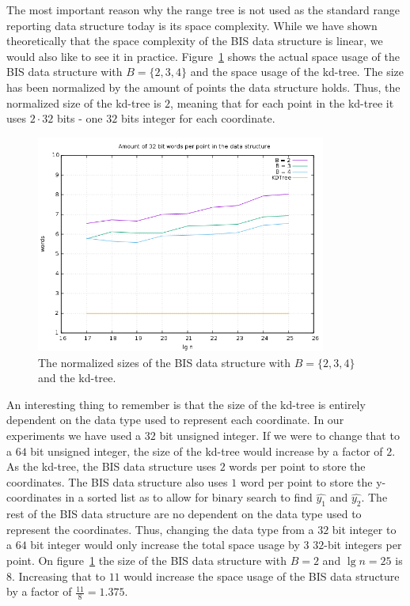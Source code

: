 The most important reason why the range tree is not used as the standard range reporting data structure today is its space complexity. While we have shown theoretically that the space complexity of the BIS data structure is linear, we would also like to see it in practice. Figure~\ref{fig:sizes} shows the actual space usage of the BIS data structure with $B=\{2,3,4\}$ and the space usage of the kd-tree. The size has been normalized by the amount of points the data structure holds. Thus, the normalized size of the kd-tree is $2$, meaning that for each point in the kd-tree it uses $2\cdot 32$ bits - one $32$ bits integer for each coordinate.

\begin{figure}[h]
    \centering
    \includegraphics[width = 0.85\textwidth]{pictures/analysis/sizes.png}
    \caption{The normalized sizes of the BIS data structure with $B=\{2,3,4\}$ and the kd-tree.}\label{fig:sizes}
\end{figure}
\clearpage


An interesting thing to remember is that the size of the kd-tree is entirely dependent on the data type used to represent each coordinate. In our experiments we have used a $32$ bit unsigned integer. If we were to change that to a $64$ bit unsigned integer, the size of the kd-tree would increase by a factor of $2$. As the kd-tree, the BIS data structure uses $2$ words per point to store the coordinates. The BIS data structure also uses $1$ word per point to store the y-coordinates in a sorted list as to allow for binary search to find $\hat{y_1}$ and $\hat{y_2}$. The rest of the BIS data structure are no dependent on the data type used to represent the coordinates. Thus, changing the data type from a $32$ bit integer to a $64$ bit integer would only increase the total space usage by $3$ $32$-bit integers per point. On figure~\ref{fig:sizes} the size of the BIS data structure with $B=2$ and $\lg n = 25$ is $8$. Increasing that to $11$ would increase the space usage of the BIS data structure by a factor of $\frac{11}{8} = 1.375$.

